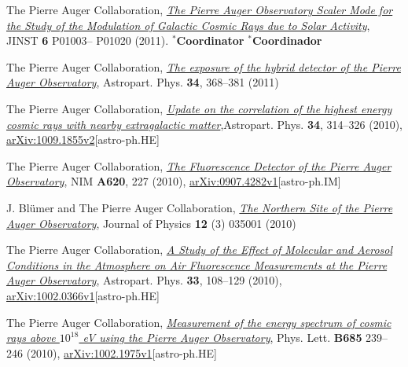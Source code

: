 \begin{etaremune}
\item {}The Pierre Auger Collaboration,
\href{http://dx.doi.org/10.1088/1748-0221/6/01/P01003}{\emph{The Pierre Auger
Observatory Scaler Mode for the Study of the Modulation of Galactic Cosmic Rays
due to Solar Activity}}, JINST {\bf 6} P01003--
P01020 (2011). \ifeng $^*${\bf{Coordinator}} \else $^*${\bf{Coordinador}} \fi

\item {}The Pierre Auger Collaboration,
\href{http://dx.doi.org/10.1016/j.astropartphys.2010.10.001}{\emph{The exposure
of the hybrid detector of the Pierre Auger Observatory}}, Astropart. Phys. {\bf
34}, 368--381 (2011)

\item {}The Pierre Auger Collaboration,
\href{http://dx.doi.org/10.1016/j.astropartphys.2010.08.010}{\emph{Update on
the correlation of the highest energy cosmic rays with nearby extragalactic
matter}},Astropart. Phys. {\bf 34}, 314--326 (2010),
\href{http://arxiv.org/abs/1009.1855}{arXiv:1009.1855v2}[astro-ph.HE]

\item {}The Pierre Auger Collaboration,
\href{http://dx.doi.org/10.1016/j.nima.2010.04.023}{\emph{The Fluorescence
Detector of the Pierre Auger Observatory}}, NIM {\bf A620}, 227 (2010),
\href{http://arxiv.org/abs/0907.4282}{arXiv:0907.4282v1}[astro-ph.IM]

\item {}J. Bl\"umer and The Pierre Auger Collaboration,
\href{http://dx.doi.org/10.1088/1367-2630/12/3/035001}{\emph{The Northern Site
of the Pierre Auger Observatory}}, Journal of Physics {\bf 12} (3) 035001
(2010)

\item {}The Pierre Auger Collaboration,
\href{http://dx.doi.org/10.1016/j.astropartphys.2009.12.005}{\emph{A Study of
the Effect of Molecular and Aerosol Conditions in the Atmosphere on Air
Fluorescence Measurements at the Pierre Auger Observatory}}, Astropart. Phys.
{\bf 33}, 108--129 (2010),
\href{http://arxiv.org/abs/0907.4282}{arXiv:1002.0366v1}[astro-ph.HE]

\item {}The Pierre Auger Collaboration,
\href{http://dx.doi.org/10.1016/j.physletb.2010.02.013}{\emph{Measurement of
the energy spectrum of cosmic rays above $10^{18}$ eV using the Pierre Auger
Observatory}}, Phys. Lett. {\bf B685} 239--246 (2010),
\href{http://arxiv.org/abs/1002.1975}{arXiv:1002.1975v1}[astro-ph.HE]


\end{etaremune}
